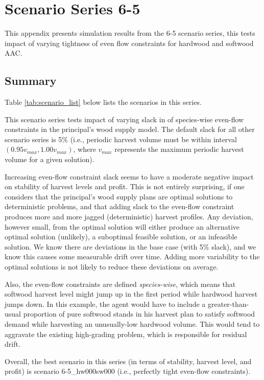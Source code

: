 \chapter{Scenario Series 6-5}

This appendix presents simulation results from the 6-5 scenario series, this tests impact of varying tightness of even flow constraints for hardwood and softwood AAC. 

\section{Summary}
Table \ref{tab:scenario_list} below lists the scenarios in this series. 

This scenario series tests impact of varying slack in of species-wise even-flow constraints in the principal's wood supply model. 
The default slack for all other scenario series is 5\% (i.e., periodic harvest volume must be within interval $(0.95 v_{max}, 1.00 v_{max})$, where $v_{max}$ represents the maximum periodic harvest volume for a given solution). 

Increasing even-flow constraint slack seems to have a moderate negative impact on stability of harvest levels and profit. This is not entirely surprising, if one considers that the principal's wood supply plans are optimal solutions to deterministic problems, and that adding slack to the even-flow constraint produces more and more jagged (deterministic) harvest profiles. Any deviation, however small, from the optimal solution will either produce an alternative optimal solution (unlikely), a suboptimal feasible solution, or an infeasible solution. We know there are deviations in the base case (with 5\% slack), and we know this causes some measurable drift over time. Adding more variability to the optimal solutions is not likely to reduce these deviations on average.

Also, the even-flow constraints are defined \emph{species-wise}, which means that softwood harvest level might jump up in the first period while hardwood harvest jumps down. In this example, the agent would have to include a greater-than-usual proportion of pure softwood stands in his harvest plan to satisfy softwood demand while harvesting an unusually-low hardwood volume. This would tend to aggravate the existing high-grading problem, which is responsible for residual drift.

Overall, the best scenario in this series (in terms of stability, harvest level, and profit) is scenario 6-5\_hw000sw000 (i.e., perfectly tight even-flow constraints).

